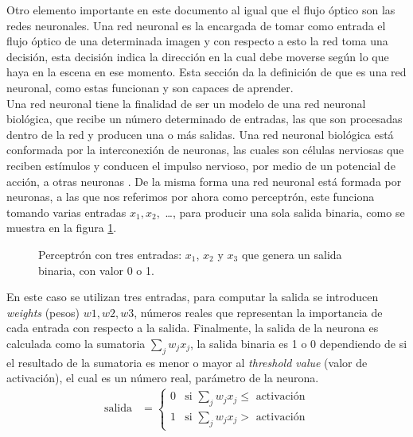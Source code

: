 \documentclass{iccmemoria}
\begin{document}
Otro elemento importante en este documento al igual que el flujo óptico son las redes neuronales. Una red neuronal es la encargada de tomar como entrada el flujo óptico de una determinada imagen y con respecto a esto la red toma una decisión, esta decisión indica la dirección en la cual debe moverse según lo que haya en la escena en ese momento. Esta sección da la definición de que es una red neuronal, como estas funcionan y son capaces de aprender.\\

Una red neuronal tiene la finalidad de ser un modelo de una red neuronal biológica, que recibe un número determinado de entradas, las que son procesadas dentro de la red y producen una o más salidas. Una red neuronal biológica está conformada por la interconexión de neuronas, las cuales son células nerviosas que reciben estímulos y conducen el impulso nervioso, por medio de un potencial de acción, a otras neuronas \cite{cayre2002common}. De la misma forma una red neuronal está formada por neuronas, a las que nos referimos por ahora como perceptrón, este funciona tomando varias entradas $ x_{1}, x_{2}, $ \dots, para producir una sola salida binaria, como se muestra en la figura \ref{fig:perceptron}.\\

\begin{figure}[H]
  \centering
  \begin{Large}
  
  \end{Large}
  \caption[Representación de un perceptrón.]{Perceptrón con tres entradas: $x_{1}$, $x_{2}$ y $x_{3}$ que genera un salida binaria, con valor 0 o 1.}
  \label{fig:perceptron}
\end{figure}

En este caso se utilizan tres entradas, para computar la salida se introducen \emph{weights} (pesos) $w1, w2, w3$, números reales que representan la importancia de cada entrada con respecto a la salida. Finalmente, la salida de la neurona es calculada como la sumatoria $ \sum_{j}{} w_{j} x_{j}$, la salida binaria es 1 o 0 dependiendo de si el resultado de la sumatoria es menor o mayor al \emph{threshold value} (valor de activación), el cual es un número real, parámetro de la neurona.\\

\begin{equation}
	\begin{split}
	\mbox{salida} & = \begin{cases}
		0 & \mbox{si } \sum_j w_j x_j \leq  \mbox{ activación}\\
		1 & \mbox{si } \sum_j w_j x_j >  \mbox{ activación}
		\end{cases}
	\end{split}
\end{equation}\\
\end{document}
